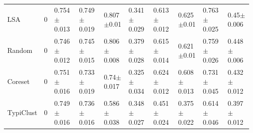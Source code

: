 \documentclass[]{article}
\begin{document}
\begin{table}[H]
{\begin{tabular}{l|lllllllll}
			LSA & 0 & 0.754$\pm${\small0.013} & 0.749$\pm${\small0.019} & 0.807$\pm${\small0.01} & 0.341$\pm${\small0.029} & 0.613$\pm${\small0.012} & 0.625$\pm${\small0.01} & 0.763$\pm${\small0.025} & 0.45$\pm${\small0.006} \\
			Random & 0 & 0.746$\pm${\small0.012} & 0.745$\pm${\small0.015} & 0.806$\pm${\small0.008} & 0.379$\pm${\small0.028} & 0.615$\pm${\small0.014} & 0.621$\pm${\small0.01} & 0.759$\pm${\small0.026} & 0.448$\pm${\small0.006} \\
			Coreset & 0 & 0.751$\pm${\small0.016} & 0.733$\pm${\small0.019} & 0.74$\pm${\small0.017} & 0.325$\pm${\small0.034} & 0.624$\pm${\small0.012} & 0.608$\pm${\small0.013} & 0.731$\pm${\small0.045} & 0.432$\pm${\small0.012} \\
			TypiClust & 0 & 0.749$\pm${\small0.016} & 0.736$\pm${\small0.016} & 0.586$\pm${\small0.038} & 0.348$\pm${\small0.027} & 0.451$\pm${\small0.024} & 0.375$\pm${\small0.022} & 0.614$\pm${\small0.046} & 0.397$\pm${\small0.012}
		\end{tabular}
	}
\end{table}
\end{document}
